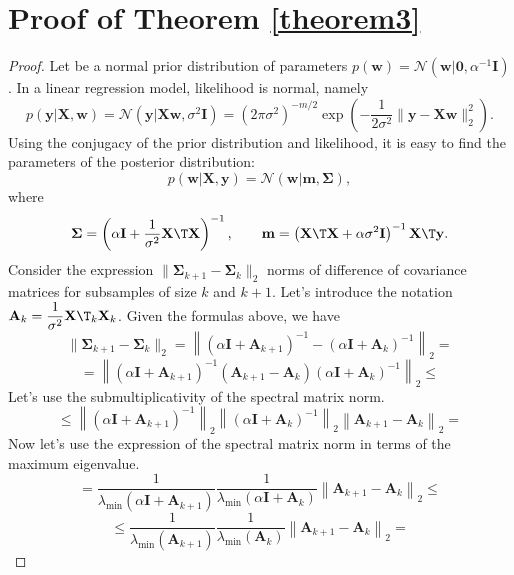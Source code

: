 \documentclass[runningheads]{llncs}
\begin{document}
\section{Proof of Theorem \ref{theorem3}}
\begin{proof}
Let be a normal prior distribution of parameters $p(\mathbf{w})=\mathcal{N}\left(\mathbf{w}|\mathbf{0}, \alpha^{-1}\mathbf{I}\right)$. In a linear regression model, likelihood is normal, namely
    \[ p(\mathbf{y} | \mathbf{X}, \mathbf{w}) = \mathcal{N}\left(\mathbf{y} |\mathbf{X}\mathbf{w}, \sigma^2\mathbf{I}\right) =\left( 2\pi\sigma^2\right)^{-m/2} \exp\left( -\dfrac{1}{2\sigma^2} \|\mathbf{y} - \mathbf{X}\mathbf{w}\|_2^2\right). \]
Using the conjugacy of the prior distribution and likelihood, it is easy to find the parameters of the posterior distribution:
    \[ p(\mathbf{w} | \mathbf{X}, \mathbf{y}) = \mathcal{N}\left(\mathbf{w} | \mathbf{m}, \mathbf{\Sigma} \right), \]
where
    \[ \mathbf{\Sigma} = \left( \alpha \mathbf{I} + \dfrac{1}{\sigma^2} \mathbf{X}\T \mathbf{X} \right)^{-1}, \qquad \mathbf{m} = \left( \mathbf{X}\T \mathbf{X} + \alpha \sigma^2 \mathbf{I} \right)^{-1} \mathbf{X}\T \mathbf{y}. \]
Consider the expression $\|\mathbf{\Sigma}_{k+1} - \mathbf{\Sigma}_k\|_2$ norms of difference of covariance matrices for subsamples of size $k$ and $k+1$. Let's introduce the notation $\mathbf{A}_k = \dfrac{1}{\sigma^2}\mathbf{X}\T_k\mathbf{X}_k$. Given the formulas above, we have
    \[ \| \mathbf{\Sigma}_{k+1} - \mathbf{\Sigma}_k \|_2 = \left\| \left( \alpha \mathbf{I} + \mathbf{A}_{k+1} \right)^{-1} - \left( \alpha \mathbf{I} + \mathbf{A}_k \right)^{-1} \right\|_2 = \]
    \[ = \left\| \left( \alpha \mathbf{I} + \mathbf{A}_{k+1} \right)^{-1} \left( \mathbf{A}_{k+1} - \mathbf{A}_k \right) \left( \alpha \mathbf{I} + \mathbf{A}_k \right)^{-1} \right\|_2 \leqslant \]
    Let's use the submultiplicativity of the spectral matrix norm.
    \[ \leqslant \left\| \left( \alpha \mathbf{I} + \mathbf{A}_{k+1} \right)^{-1} \right\|_2 \left\| \left( \alpha \mathbf{I} + \mathbf{A}_k \right)^{-1} \right\|_2 \left\| \mathbf{A}_{k+1} - \mathbf{A}_k \right\|_2 = \]
    Now let's use the expression of the spectral matrix norm in terms of the maximum eigenvalue.
    \[ = \dfrac{1}{\lambda_{\min}\left( \alpha \mathbf{I} + \mathbf{A}_{k+1} \right)} \dfrac{1}{\lambda_{\min}\left( \alpha \mathbf{I} + \mathbf{A}_k \right)} \left\| \mathbf{A}_{k+1} - \mathbf{A}_k \right\|_2 \leqslant \]
    \[ \leqslant \dfrac{1}{\lambda_{\min}\left( \mathbf{A}_{k+1} \right)} \dfrac{1}{\lambda_{\min}\left( \mathbf{A}_k \right)} \left\| \mathbf{A}_{k+1} - \mathbf{A}_k \right\|_2 = \]

\end{proof}
\end{document}

